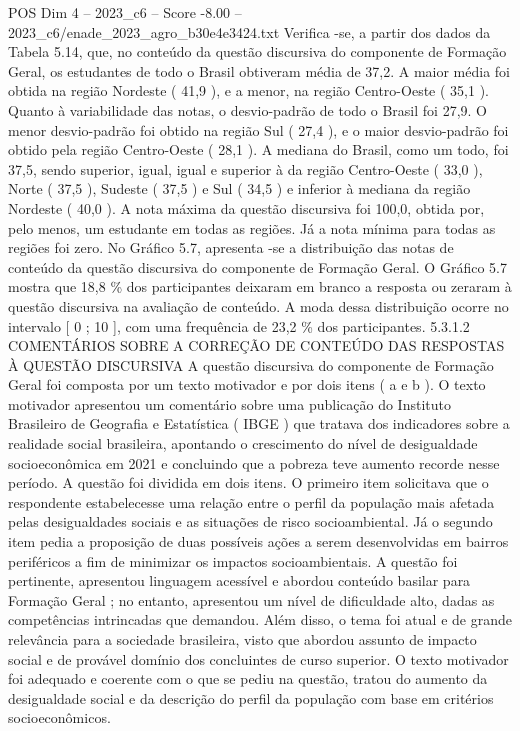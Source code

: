 \begin{textsample}{POS Dim 4 – 2023\_c6 – Score -8.00 – 2023\_c6/enade\_2023\_agro\_b30e4e3424.txt}
Verifica -se, a partir dos dados da Tabela 5.14, que, no conteúdo da questão discursiva do componente de Formação Geral, os estudantes de todo o Brasil obtiveram média de 37,2.
A maior média foi obtida na região Nordeste ( 41,9 ), e a menor, na região Centro-Oeste ( 35,1 ).
Quanto à variabilidade das notas, o desvio-padrão de todo o Brasil foi 27,9.
O menor desvio-padrão foi obtido na região Sul ( 27,4 ), e o maior desvio-padrão foi obtido pela região Centro-Oeste ( 28,1 ).
A mediana do Brasil, como um todo, foi 37,5, sendo superior, igual, igual e superior à da região Centro-Oeste ( 33,0 ), Norte ( 37,5 ), Sudeste ( 37,5 ) e Sul ( 34,5 ) e inferior à mediana da região Nordeste ( 40,0 ).
A nota máxima da questão discursiva foi 100,0, obtida por, pelo menos, um estudante em todas as regiões.
Já a nota mínima para todas as regiões foi zero.
No Gráfico 5.7, apresenta -se a distribuição das notas de conteúdo da questão discursiva do componente de Formação Geral.
O Gráfico 5.7 mostra que 18,8 \% dos participantes deixaram em branco a resposta ou zeraram à questão discursiva na avaliação de conteúdo.
A moda dessa distribuição ocorre no intervalo [ 0 ; 10 ], com uma frequência de 23,2 \% dos participantes. 5.3.1.2 COMENTÁRIOS SOBRE A CORREÇÃO DE CONTEÚDO DAS RESPOSTAS À QUESTÃO DISCURSIVA A questão discursiva do componente de Formação Geral foi composta por um texto motivador e por dois itens ( a e b ).
O texto motivador apresentou um comentário sobre uma publicação do Instituto Brasileiro de Geografia e Estatística ( IBGE ) que tratava dos indicadores sobre a realidade social brasileira, apontando o crescimento do nível de desigualdade socioeconômica em 2021 e concluindo que a pobreza teve aumento recorde nesse período.
A questão foi dividida em dois itens.
O primeiro item solicitava que o respondente estabelecesse uma relação entre o perfil da população mais afetada pelas desigualdades sociais e as situações de risco socioambiental.
Já o segundo item pedia a proposição de duas possíveis ações a serem desenvolvidas em bairros periféricos a fim de minimizar os impactos socioambientais.
A questão foi pertinente, apresentou linguagem acessível e abordou conteúdo basilar para Formação Geral ; no entanto, apresentou um nível de dificuldade alto, dadas as competências intrincadas que demandou.
Além disso, o tema foi atual e de grande relevância para a sociedade brasileira, visto que abordou assunto de impacto social e de provável domínio dos concluintes de curso superior.
O texto motivador foi adequado e coerente com o que se pediu na questão, tratou do aumento da desigualdade social e da descrição do perfil da população com base em critérios socioeconômicos.

\end{textsample}
